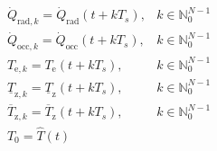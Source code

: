 \documentclass[10pt]{article}
\begin{document}
\begin{subequations}
\begin{align}
   & \dot{Q}_{\text{rad},k} =  \dot{Q}_{\text{rad}}(t+ k T_s), & k \in \mathbb{N}_{0}^{N-1} \label{eq:mpc_general:d0} \\
   & \dot{Q}_{\text{occ},k} = \dot{Q}_{\text{occ}}(t+ k T_s), & k \in \mathbb{N}_{0}^{N-1} \label{eq:mpc_general:d0} \\
   & T_{\text{e},k} = T_{\text{e}}(t+ k T_s), & k \in \mathbb{N}_{0}^{N-1} \label{eq:mpc_general:d0} \\
  & \underline{T}_{\text{z},k} =  \underline{T}_{\text{z}}(t+ k T_s), & k \in \mathbb{N}_{0}^{N-1} \label{eq:mpc_general:r_low} \\
    & \overline{T}_{\text{z},k} =  \overline{T}_{\text{z}}(t+ k T_s), & k \in \mathbb{N}_{0}^{N-1} \label{eq:mpc_general:r_up} \\
  & T_0 = \hat{T}(t) \label{eq:mpc_general:x0}
\end{align}
\end{subequations}
\end{document}
